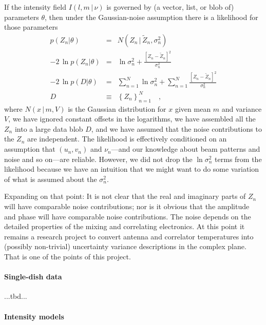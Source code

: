 \documentclass[12pt]{article}
\newcommand{\set}[1]{\left\{{#1}\right\}}
\newcommand{\given}{\,|\,}
\newcommand{\expectation}[1]{\tilde{#1}}
\newcommand{\normal}{N}
\begin{document}
If the intensity field $I(l,m\given\nu)$ is governed by (a vector,
list, or blob of) parameters $\theta$, then under the Gaussian-noise
assumption there is a likelihood for those parameters
\begin{eqnarray}
p(Z_n|\theta) &=& \normal(Z_n\given\expectation{Z}_n,\sigma_n^2)
\\
-2\,\ln p(Z_n|\theta) &=& \ln\sigma_n^2 + \frac{[Z_n - \expectation{Z}_n]^2}{\sigma_n^2}
\\
-2\,\ln p(D|\theta) &=& \sum_{n=1}^N \ln\sigma_n^2 + \sum_{n=1}^N \frac{[Z_n - \expectation{Z}_n]^2}{\sigma_n^2}
\\
D &\equiv& \set{Z_n}_{n=1}^N
\quad ,
\end{eqnarray}
where $\normal(x\given m,V)$ is the Gaussian distribution for $x$
given mean $m$ and variance $V$, we have ignored constant offsets in
the logarithms, we have assembled all the $Z_n$ into a large data blob
$D$, and we have assumed that the noise contributions to the $Z_n$ are
independent.  The likelihood is effectively conditioned on an
assumption that $(u_n, v_n)$ and $\nu_n$---and our knowledge about
beam patterns and noise and so on---are reliable.  However, we did not
drop the $\ln\sigma_n^2$ terms from the likelihood because we have an
intuition that we might want to do some variation of what is assumed
about the $\sigma_n^2$.

Expanding on that point: It is not clear that the real and imaginary
parts of $Z_n$ will have comparable noise contributions; nor is it
obvious that the amplitude and phase will have comparable noise
contributions.  The noise depends on the detailed properties of the
mixing and correlating electronics.  At this point it remains a
research project to convert antenna and correlator temperatures into
(possibly non-trivial) uncertainty variance descriptions in the
complex plane.  That is one of the points of this project.

\paragraph{Single-dish data}

...tbd...

\paragraph{Intensity models}
\end{document}
